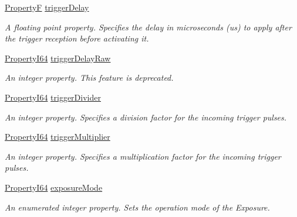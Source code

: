 \begin{DoxyCompactItemize}
\hyperlink{group___common_interface_gaf54865fe5a3d5cfd15f9a111b40d09f9}{Property\+F} \hyperlink{classmv_i_m_p_a_c_t_1_1acquire_1_1_gen_i_cam_1_1_acquisition_control_a0c0123d1c00bac1adba870bc11368080}{trigger\+Delay}
\begin{DoxyCompactList}\small\item\em A floating point property. Specifies the delay in microseconds (us) to apply after the trigger reception before activating it. \end{DoxyCompactList}\item 
\hyperlink{group___common_interface_ga81749b2696755513663492664a18a893}{Property\+I64} \hyperlink{classmv_i_m_p_a_c_t_1_1acquire_1_1_gen_i_cam_1_1_acquisition_control_ad96d0a854c6dcc41256849ea89d706d3}{trigger\+Delay\+Raw}
\begin{DoxyCompactList}\small\item\em An integer property. This feature is deprecated. \end{DoxyCompactList}\item 
\hyperlink{group___common_interface_ga81749b2696755513663492664a18a893}{Property\+I64} \hyperlink{classmv_i_m_p_a_c_t_1_1acquire_1_1_gen_i_cam_1_1_acquisition_control_afd3efded5da820a4dbe8510bf3e40471}{trigger\+Divider}
\begin{DoxyCompactList}\small\item\em An integer property. Specifies a division factor for the incoming trigger pulses. \end{DoxyCompactList}\item 
\hyperlink{group___common_interface_ga81749b2696755513663492664a18a893}{Property\+I64} \hyperlink{classmv_i_m_p_a_c_t_1_1acquire_1_1_gen_i_cam_1_1_acquisition_control_aeb5fac0df36681f7800f45f2068707b0}{trigger\+Multiplier}
\begin{DoxyCompactList}\small\item\em An integer property. Specifies a multiplication factor for the incoming trigger pulses. \end{DoxyCompactList}\item 
\hyperlink{group___common_interface_ga81749b2696755513663492664a18a893}{Property\+I64} \hyperlink{classmv_i_m_p_a_c_t_1_1acquire_1_1_gen_i_cam_1_1_acquisition_control_a0dfebf2075d401828a7eac11fac790d0}{exposure\+Mode}
\begin{DoxyCompactList}\small\item\em An enumerated integer property. Sets the operation mode of the Exposure. \end{DoxyCompactList}\item 

\end{DoxyCompactItemize}
